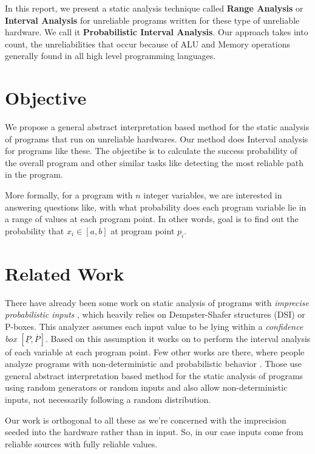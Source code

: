 \documentclass[final,3p, review, times]{Elsevier/elsarticle}
\begin{document}
In this report, we present a static analysis technique called \textbf{Range Analysis} or \textbf{Interval Analysis} for unreliable programs written for these type of unreliable hardware. We call it \textbf{Probabilistic Interval Analysis}. Our approach takes into count, the unreliabilities that occur because of ALU and Memory operations generally found in all high level programming languages.

\section{Objective}

We propose a general abstract interpretation based method for the static analysis of programs that run on unreliable hardwares. Our method does Interval analysis for programs like these. The objectibe is to calculate the success probability of the overall program and other similar tasks like detecting the most reliable path in the program.

More formally, for a program with $n$ integer variables, we are interested in answering questions like, with what probability does each program variable lie in a range of values at each program point. In other words, goal is to find out the probability that $x_i\in[a,b]$ at program point $p_i$.

\section{Related Work}

There have already been some work on static analysis of programs with \emph{imprecise probabilistic inputs} \cite{vstte13}, which heavily relies on Dempster-Shafer structures (DSI) or P-boxes. This analyzer assumes each input value to be lying within a \textit{confidence box} $[\underline{P},\overline{P}]$. Based on this assumption it works on to perform the interval analysis of each variable at each program point. Few other works are there, where people analyze programs with non-deterministic and probabilistic behavior \cite{monn01}\cite{sumit13}. Those use general abstract interpretation based method for the static analysis of programs using random generators or random inputs and also allow non-deterministic inputs, not necessarily following a random distribution.

Our work is orthogonal to all these as we're concerned with the imprecision seeded into the hardware rather than in input. So, in our case inputs come from reliable sources with fully reliable values.
\end{document}

